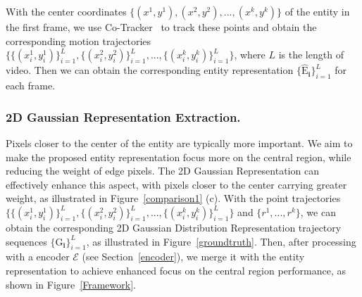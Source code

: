 \documentclass[runningheads]{llncs}
\newcommand{\encoder}{\mathcal{E}}
\begin{document}
%
With the center coordinates $\{(x^1,y^1), (x^2,y^2), ..., (x^k,y^k)\}$ of the entity in the first frame, we use Co-Tracker~\cite{karaev2023cotracker} to track these points and obtain the corresponding motion trajectories $\{\{(x^1_i,y^1_i)\}_{i=1}^L,\{(x^2_i,y^2_i)\}_{i=1}^L,...,\{(x^k_i,y^k_i)\}_{i=1}^L\}$, where $L$ is the length of video.
%
Then we can obtain the corresponding entity representation $\{\bm{\mathrm{\hat{E}}_i}\}_{i=1}^L$ for each frame.


\subsubsection{2D Gaussian Representation Extraction.}
%
\label{gaussian}
%
Pixels closer to the center of the entity are typically more important.
%
We aim to make the proposed entity representation focus more on the central region, while reducing the weight of edge pixels.
%
The 2D Gaussian Representation can effectively enhance this aspect, with pixels closer to the center carrying greater weight, as illustrated in Figure~\ref{comparison1} (c).
%
With the point trajectories $\{\{(x^1_i,y^1_i)\}_{i=1}^L,\{(x^2_i,y^2_i)\}_{i=1}^L,...,\{(x^k_i,y^k_i)\}_{i=1}^L\}$ and $\{r^1,...,r^k\}$, we can obtain the corresponding 2D Gaussian Distribution Representation trajectory sequences $\{\bm{\mathrm{G}_i}\}_{i=1}^L$, as illustrated in Figure~\ref{groundtruth}.
%
Then, after processing with a encoder $\encoder$ (see Section~\ref{encoder}), we merge it with the entity representation to achieve enhanced focus on the central region performance, as shown in Figure~\ref{Framework}.
%
\end{document}
